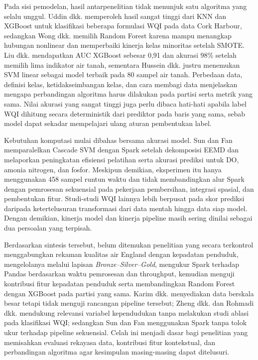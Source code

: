 Pada sisi pemodelan, hasil antarpenelitian tidak menunjuk satu algoritma yang selalu unggul. Uddin dkk. \cite{uddin_performance_2023} memperoleh hasil sangat tinggi dari KNN dan XGBoost untuk klasifikasi beberapa formulasi WQI pada data Cork Harbour, sedangkan Wong dkk. \cite{wong_water_2022} memilih Random Forest karena mampu menangkap hubungan nonlinear dan memperbaiki kinerja kelas minoritas setelah SMOTE. Liu dkk. \cite{liu_wqi_2024} mendapatkan AUC XGBoost sebesar 0,91 dan akurasi 98\% setelah memilih lima indikator air tanah, sementara Hussein dkk. \cite{hussein_machine_2023} justru menemukan SVM linear sebagai model terbaik pada 80 sampel air tanah. Perbedaan data, definisi kelas, ketidakseimbangan kelas, dan cara membagi data menjelaskan mengapa perbandingan algoritma harus dilakukan pada partisi serta metrik yang sama. Nilai akurasi yang sangat tinggi juga perlu dibaca hati-hati apabila label WQI dihitung secara deterministik dari prediktor pada baris yang sama, sebab model dapat sekadar mempelajari ulang aturan pembentukan label.

Kebutuhan komputasi mulai dibahas bersama akurasi model. Sun dan Fan \cite{sun_combined_2022} memparalelkan Cascade SVM dengan Spark setelah dekomposisi EEMD dan melaporkan peningkatan efisiensi pelatihan serta akurasi prediksi untuk DO, amonia nitrogen, dan fosfor. Meskipun demikian, eksperimen itu hanya menggunakan 458 sampel runtun waktu dan tidak membandingkan alur Spark dengan pemrosesan sekuensial pada pekerjaan pembersihan, integrasi spasial, dan pembentukan fitur. Studi-studi WQI lainnya lebih berpusat pada skor prediksi daripada ketertelusuran transformasi dari data mentah hingga data siap model. Dengan demikian, kinerja model dan kinerja pipeline masih sering dinilai sebagai dua persoalan yang terpisah.

Berdasarkan sintesis tersebut, belum ditemukan penelitian yang secara terkontrol menggabungkan rekaman kualitas air England dengan kepadatan penduduk, mengelolanya melalui lapisan \textit{Bronze--Silver--Gold}, mengukur Spark terhadap Pandas berdasarkan waktu pemrosesan dan throughput, kemudian menguji kontribusi fitur kepadatan penduduk serta membandingkan Random Forest dengan XGBoost pada partisi yang sama. Karim dkk. \cite{karim_comprehensive_2025} menyediakan data berskala besar tetapi tidak menguji rancangan pipeline tersebut; Zheng dkk. \cite{zheng_large_2023} dan Rohmadi dkk. \cite{rohmadi_impact_2022} mendukung relevansi variabel kependudukan tanpa melakukan studi ablasi pada klasifikasi WQI; sedangkan Sun dan Fan \cite{sun_combined_2022} menggunakan Spark tanpa tolok ukur terhadap pipeline sekuensial. Celah ini menjadi dasar bagi penelitian yang memisahkan evaluasi rekayasa data, kontribusi fitur kontekstual, dan perbandingan algoritma agar kesimpulan masing-masing dapat ditelusuri.

